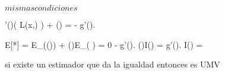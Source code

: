 \documentclass[../Main/main]{subfiles}
\begin{document}
{	
	{
		{
			$ mismas condiciones $
		}
		\holds
		{
			
		}
		\demonstration
		{
			\lambda'(\theta)\log( L(x,\theta) ) + \lambda(\theta) = - g'(\theta).

			E[*] = E_\theta(\lambda(\theta)) + \lambda(\theta)E_\theta( ) = 0 - g'(\theta).
			\lambda(\theta)I(\theta) = g'(\theta).
			I(\theta) = 
		}
	}
	
	
	
	
	
	
	si existe un estimador que da la igualdad entonces es UMV

}
\end{document}
